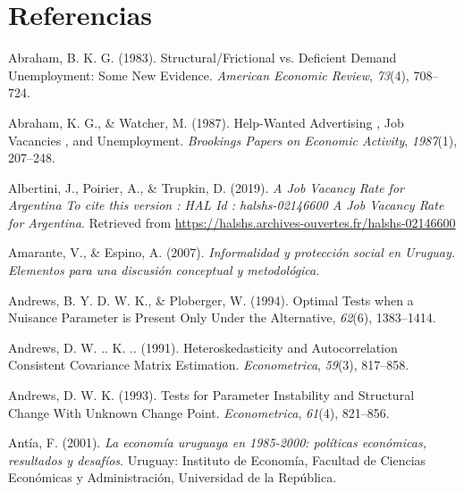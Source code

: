 \documentclass[12pt,oneside]{reedthesis}
\begin{document}

\noindent
\setlength{\parindent}{-0.20in}
\setlength{\leftskip}{0.20in}
\setlength{\parskip}{8pt}

\hypertarget{referencias}{%
\chapter*{Referencias}\label{referencias}}

\hypertarget{refs}{}
\leavevmode\hypertarget{ref-Abraham1983}{}%
Abraham, B. K. G. (1983). Structural/Frictional vs. Deficient Demand Unemployment: Some New Evidence. \emph{American Economic Review}, \emph{73}(4), 708--724.

\leavevmode\hypertarget{ref-Abraham1987}{}%
Abraham, K. G., \& Watcher, M. (1987). Help-Wanted Advertising , Job Vacancies , and Unemployment. \emph{Brookings Papers on Economic Activity}, \emph{1987}(1), 207--248.

\leavevmode\hypertarget{ref-ArgentinaBC2019}{}%
Albertini, J., Poirier, A., \& Trupkin, D. (2019). \emph{A Job Vacancy Rate for Argentina To cite this version : HAL Id : halshs-02146600 A Job Vacancy Rate for Argentina}. Retrieved from \url{https://halshs.archives-ouvertes.fr/halshs-02146600}

\leavevmode\hypertarget{ref-Amarante2007}{}%
Amarante, V., \& Espino, A. (2007). \emph{Informalidad y protección social en Uruguay. Elementos para una discusión conceptual y metodológica}.

\leavevmode\hypertarget{ref-Andrews1994}{}%
Andrews, B. Y. D. W. K., \& Ploberger, W. (1994). Optimal Tests when a Nuisance Parameter is Present Only Under the Alternative, \emph{62}(6), 1383--1414.

\leavevmode\hypertarget{ref-Andrews1991}{}%
Andrews, D. W. .. K. .. (1991). Heteroskedasticity and Autocorrelation Consistent Covariance Matrix Estimation. \emph{Econometrica}, \emph{59}(3), 817--858.

\leavevmode\hypertarget{ref-Andrews1993}{}%
Andrews, D. W. K. (1993). Tests for Parameter Instability and Structural Change With Unknown Change Point. \emph{Econometrica}, \emph{61}(4), 821--856.

\leavevmode\hypertarget{ref-Antia2001}{}%
Antía, F. (2001). \emph{La economía uruguaya en 1985-2000: políticas económicas, resultados y desafíos}. Uruguay: Instituto de Economía, Facultad de Ciencias Económicas y Administración, Universidad de la República.
\end{document}
